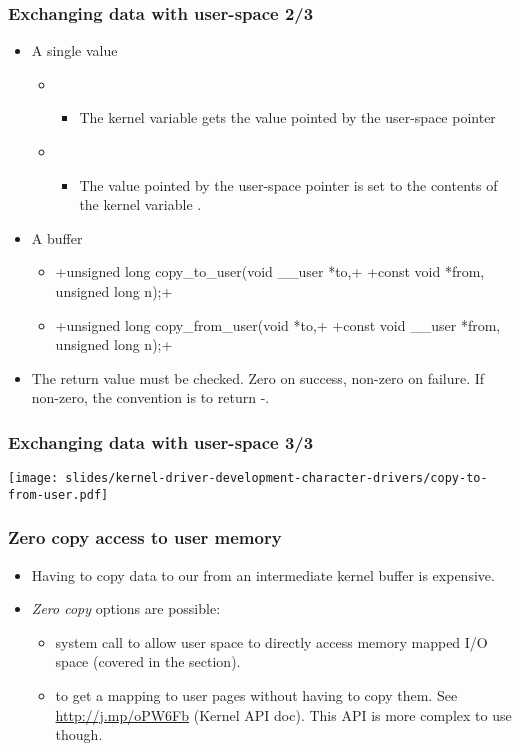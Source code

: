 \begin{frame}[fragile]
  \frametitle{Exchanging data with user-space 2/3}
  \begin{itemize}
  \item A single value
    \begin{itemize}
    \item {}
      \begin{itemize}
      \item The kernel variable  gets the value pointed by the
        user-space pointer 
      \end{itemize}
    \item {}
      \begin{itemize}
      \item The value pointed by the user-space pointer  is
        set to the contents of the kernel variable .
      \end{itemize}
    \end{itemize}
  \item A buffer
    \begin{itemize}
    \item {}+unsigned long copy_to_user(void __user *to,+
      +const void *from, unsigned long n);+
    \item {}+unsigned long copy_from_user(void *to,+
      +const void __user *from, unsigned long n);+
    \end{itemize}
  \item The return value must be checked. Zero on success, non-zero on
    failure. If non-zero, the convention is to return -.
  \end{itemize}
\end{frame}

\begin{frame}
 \frametitle{Exchanging data with user-space 3/3}
 \begin{center}
    \texttt{[image: slides/kernel-driver-development-character-drivers/copy-to-from-user.pdf]}
 \end{center}
\end{frame}

\begin{frame}
  \frametitle{Zero copy access to user memory}
  \begin{itemize}
  \item Having to copy data to our from an intermediate kernel buffer
    is expensive.
  \item \emph{Zero copy} options are possible:
    \begin{itemize}
    \item {} system call to allow user space to directly
      access memory mapped I/O space (covered in the 
      section).
    \item {} to get a mapping to user pages
      without having to copy them. See \url{http://j.mp/oPW6Fb}
      (Kernel API doc). This API is more complex to use though.
    \end{itemize}
  \end{itemize}
\end{frame}

